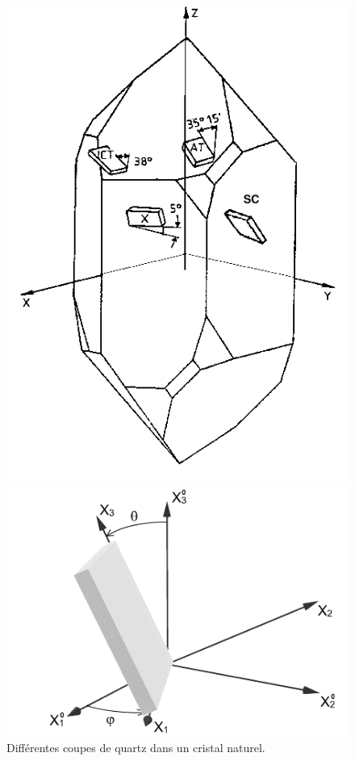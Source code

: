 \begin{figure}[H]
    \centering
    \begin{minipage}[t]{0.48\textwidth}
        \centering
        \includegraphics[width=\textwidth]{assets/figures/Orientation-of-different-cuts-in-a-natural-quartz-crystal.png}
        \caption{Différentes coupes de quartz dans un cristal naturel.}
        \label{fig:quartz_cuts}
    \end{minipage}
    \hfill
    \begin{minipage}[t]{0.48\textwidth}
        \centering
        \includegraphics[width=\textwidth]{assets/figures/ph-and-th-cut-angles.png}

\end{minipage}
\end{figure}
